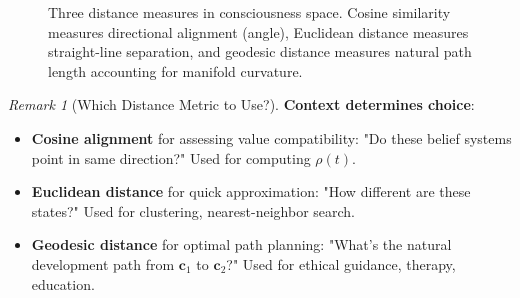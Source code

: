 \documentclass[11pt,a4paper]{article}
\theoremstyle{definition}
\theoremstyle{remark}
\newtheorem{remark}{Remark}[section]
\newcommand{\cc}{\mathbf{c}}
\begin{document}
\begin{small}
\begin{figure}[H]
\centering
{}
\caption{Three distance measures in consciousness space. Cosine similarity measures directional alignment (angle), Euclidean distance measures straight-line separation, and geodesic distance measures natural path length accounting for manifold curvature.}
\label{fig:distance_measures}
\end{figure}

\begin{remark}[Which Distance Metric to Use?]
\textbf{Context determines choice}:

\begin{itemize}
    \item \textbf{Cosine alignment} for assessing value compatibility: "Do these belief systems point in same direction?" Used for computing \(\rho(t)\).
    
    \item \textbf{Euclidean distance} for quick approximation: "How different are these states?" Used for clustering, nearest-neighbor search.
    
    \item \textbf{Geodesic distance} for optimal path planning: "What's the natural development path from \(\cc_1\) to \(\cc_2\)?" Used for ethical guidance, therapy, education.
\end{itemize}


\end{remark}
\end{small}
\end{document}
